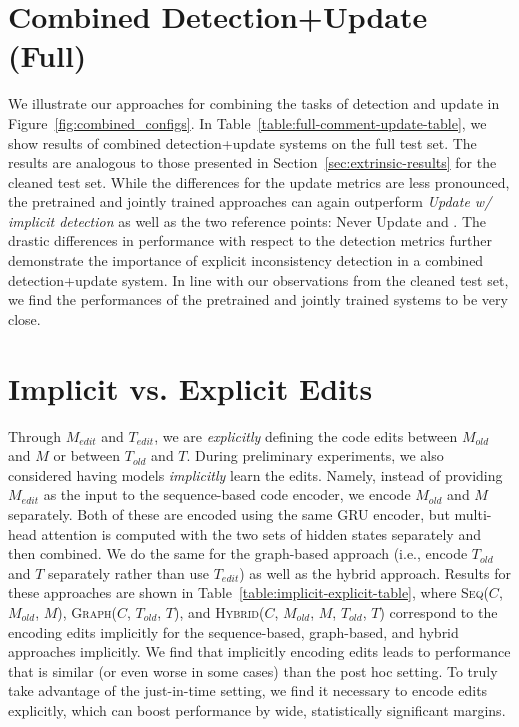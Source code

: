 \documentclass[letterpaper]{article} %
\newcommand{\Comment}{$C$}
\newcommand{\OldCode}{$M_{old}$}
\newcommand{\NewCode}{$M$}
\newcommand{\Posthoc}{post hoc}
\newcommand{\JustInTime}{just-in-time}
\newcommand{\EditCode}{$M_{edit}$}
\newcommand{\NewTree}{$T$}
\newcommand{\OldTree}{$T_{old}$}
\newcommand{\EditTree}{$T_{edit}$}
\newcommand{\SeqModel}{\textsc{Seq}}
\newcommand{\GraphModel}{\textsc{Graph}}
\newcommand{\HybridModel}{\textsc{Hybrid}}
\newcommand{\UpdateCopy}{Update w/ implicit detection}
\newcommand{\JustInTimeSeqImplicit}{\SeqModel{}(\Comment{}, \OldCode{}, \NewCode{})}
\newcommand{\JustInTimeGraphImplicit}{\GraphModel{}(\Comment{}, \OldTree{}, \NewTree{})}
\newcommand{\JustInTimeHybridImplicit}{\HybridModel{}(\Comment{}, \OldCode{}, \NewCode{}, \OldTree{}, \NewTree{})}
\begin{document}
\section{Combined Detection+Update (Full)}
\label{appendix:combined}
We illustrate our approaches for combining the tasks of detection and update in Figure~\ref{fig:combined_configs}. In Table~\ref{table:full-comment-update-table}, we show results of combined detection+update systems on the full test set. The results are analogous to those presented in Section~\ref{sec:extrinsic-results} for the cleaned test set. While the differences for the update metrics are less pronounced, the pretrained and jointly trained approaches can again outperform \textit{\UpdateCopy{}} as well as the two reference points: Never Update and \citet{panthaplackel2020update}. The drastic differences in performance with respect to the detection metrics further demonstrate the importance of explicit inconsistency detection in a combined detection+update system. In line with our observations from the cleaned test set, we find the performances of the pretrained and jointly trained systems to be very close. 



\section{Implicit vs. Explicit Edits}
\label{appendix:implicit_explicit}
Through \EditCode{} and \EditTree{}, we are \textit{explicitly} defining the code edits between \OldCode{} and \NewCode{} or between \OldTree{} and \NewTree{}. During preliminary experiments, we also considered having models \textit{implicitly} learn the edits. Namely, instead of providing \EditCode{} as the input to the sequence-based code encoder, we encode \OldCode{} and \NewCode{} separately. Both of these are encoded using the same GRU encoder, but multi-head attention is computed with the two sets of hidden states separately and then combined. We do the same for the graph-based approach (i.e., encode \OldTree{} and \NewTree{} separately rather than use \EditTree{}) as well as the hybrid approach.
Results for these approaches are shown in Table~\ref{table:implicit-explicit-table}, where \JustInTimeSeqImplicit{}, \JustInTimeGraphImplicit{},  and \JustInTimeHybridImplicit{} correspond to the encoding edits implicitly for the sequence-based, graph-based, and hybrid approaches implicitly. We find that implicitly encoding edits leads to performance that is similar (or even worse in some cases) than the \Posthoc{} setting. To truly take advantage of the \JustInTime{} setting, we find it necessary to encode edits explicitly, which can boost performance by wide, statistically significant margins. 
\end{document}
